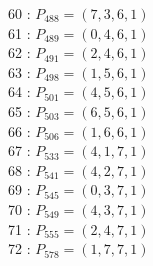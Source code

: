 \documentclass{article}
\begin{document}
{\begin{multicols}{3}
60 : $P_{488}=( 7, 3, 6, 1 )$\\
61 : $P_{489}=( 0, 4, 6, 1 )$\\
62 : $P_{491}=( 2, 4, 6, 1 )$\\
63 : $P_{498}=( 1, 5, 6, 1 )$\\
64 : $P_{501}=( 4, 5, 6, 1 )$\\
65 : $P_{503}=( 6, 5, 6, 1 )$\\
66 : $P_{506}=( 1, 6, 6, 1 )$\\
67 : $P_{533}=( 4, 1, 7, 1 )$\\
68 : $P_{541}=( 4, 2, 7, 1 )$\\
69 : $P_{545}=( 0, 3, 7, 1 )$\\
70 : $P_{549}=( 4, 3, 7, 1 )$\\
71 : $P_{555}=( 2, 4, 7, 1 )$\\
72 : $P_{578}=( 1, 7, 7, 1 )$\\
\end{multicols}


%


%


}%
\end{document}
